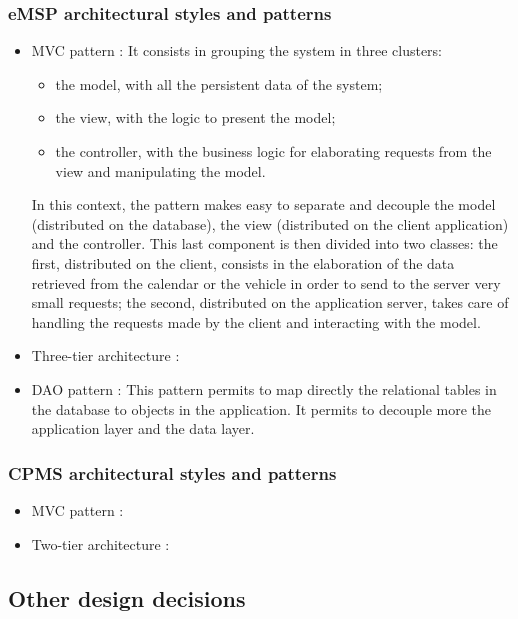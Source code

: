 \subsubsection{\ac{eMSP} architectural styles and patterns}
\begin{itemize}
    \item \acl{MVC} pattern \cite{ref:MVC-pattern}: It consists in grouping the system in three clusters: \begin{itemize}
              \item the model, with all the persistent data of the system;
              \item the view, with the logic to present the model;
              \item the controller, with the business logic for elaborating requests from the view and manipulating the model.
          \end{itemize}
          In this context, the pattern makes easy to separate and decouple the model (distributed on the database), the view (distributed on the client application) and the controller.
          This last component is then divided into two classes:
          the first, distributed on the client, consists in the elaboration of the data retrieved from the calendar or the vehicle in order to send to the server very small requests;
          the second, distributed on the application server, takes care of handling the requests made by the client and interacting with the model.
    \item Three-tier architecture \cite{ref:multitier-pattern}:
    \item \ac{DAO} pattern \cite{ref:dao-pattern}: This pattern permits to map directly the relational tables in the database to objects in the application. It permits to decouple more the application layer and the data layer.
\end{itemize}

\subsubsection{\ac{CPMS} architectural styles and patterns}
\begin{itemize}
    \item \acl{MVC} pattern \cite{ref:MVC-pattern}:
    \item Two-tier architecture \cite{ref:multitier-pattern}:
\end{itemize}


\subsection{Other design decisions}
\clearpage